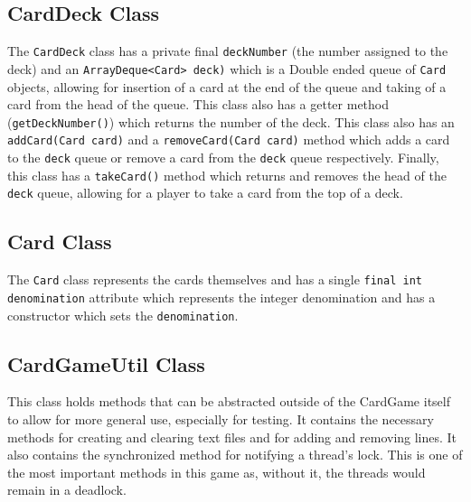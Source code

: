 \documentclass[a4paper, 11pt] {article}
\begin{document}
\subsection*{CardDeck Class}
The \texttt{CardDeck} class has a private final \texttt{deckNumber} (the number assigned to the deck) and an \texttt{ArrayDeque<Card> deck)} which is a Double ended queue of \texttt{Card} objects, allowing for insertion of a card at the end of the queue and taking of a card from the head of the queue. This class also has a getter method (\texttt{getDeckNumber()}) which returns the number of the deck. This class also has an \texttt{addCard(Card card)} and a \texttt{removeCard(Card card)} method which adds a card to the \texttt{deck} queue or remove a card from the \texttt{deck} queue respectively. Finally, this class has a \texttt{takeCard()} method which returns and removes the head of the \texttt{deck} queue, allowing for a player to take a card from the top of a deck.

\subsection*{Card Class}
The \texttt{Card} class represents the cards themselves and has a single \texttt{final int denomination} attribute which represents the integer denomination and has a constructor which sets the \texttt{denomination}.

\subsection*{CardGameUtil Class}
This class holds methods that can be abstracted outside of the CardGame itself to allow for more general use, especially for testing. It contains the necessary methods for creating and clearing text files and for adding and removing lines. It also contains the synchronized method for notifying a thread's lock. This is one of the most important methods in this game as, without it, the threads would remain in a deadlock.
\end{document}
